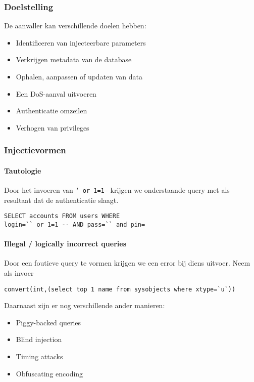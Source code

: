 \documentclass[../main.tex]{subfiles}
\begin{document}
\subsubsection{Doelstelling}
De aanvaller kan verschillende doelen hebben:
\begin{multicols}{2}
\begin{itemize}
	\item Identificeren van injecteerbare parameters
	\item Verkrijgen metadata van de database
	\item Ophalen, aanpassen of updaten van data
	\item Een DoS-aanval uitvoeren
	\item Authenticatie omzeilen
	\item Verhogen van privileges
\end{itemize}
\end{multicols}

\subsubsection{Injectievormen}

\paragraph{Tautologie} Door het invoeren van \texttt{` or 1=1--} krijgen we onderstaande query met als resultaat dat de authenticatie slaagt.
\begin{lstlisting}[caption=Tautologie]
SELECT accounts FROM users WHERE
login=`` or 1=1 -- AND pass=`` and pin=
\end{lstlisting}

\paragraph{Illegal / logically incorrect queries} Door een foutieve query te vormen krijgen we een error bij diens uitvoer. Neem als invoer
\begin{lstlisting}[caption=Illegal input]
convert(int,(select top 1 name from sysobjects where xtype=`u`))
\end{lstlisting}
\noindent
Daarnaast zijn er nog verschillende ander manieren:
\begin{multicols}{2}
\begin{itemize}
	\item Piggy-backed queries
	\item Blind injection
	\item Timing attacks
	\item Obfuscating encoding
\end{itemize}
\end{multicols}
\end{document}
